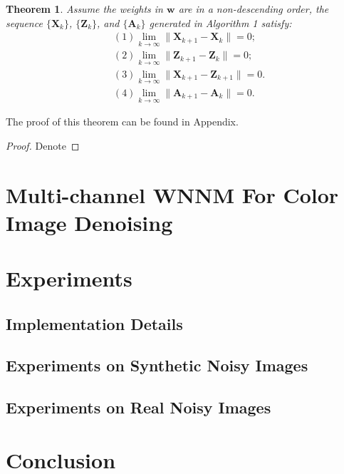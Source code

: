 \documentclass[10pt,twocolumn,letterpaper]{article}
\newtheorem{theorem}{Theorem}
\begin{document}
\begin{theorem}
Assume the weights in $\bm{w}$ are in a non-descending order, the sequence $\{\mathbf{X}_{k}\}$, $\{\mathbf{Z}_{k}\}$, and $\{\mathbf{A}_{k}\}$ generated in Algorithm 1 satisfy:
\begin{align}
&(1) \lim_{k \to \infty} \|\mathbf{X}_{k+1}-\mathbf{X}_{k}\|=0;
\\
&(2) \lim_{k \to \infty} \|\mathbf{Z}_{k+1}-\mathbf{Z}_{k}\|=0;
\\
&(3) \lim_{k \to \infty} \|\mathbf{X}_{k+1}-\mathbf{Z}_{k+1}\|=0.
\\
&(4) \lim_{k \to \infty} \|\mathbf{A}_{k+1}-\mathbf{A}_{k}\|=0.
\end{align}
\end{theorem}
The proof of this theorem can be found in Appendix.
\begin{proof}
Denote


\end{proof}








\section{Multi-channel WNNM For Color Image Denoising}


\section{Experiments}


\subsection{Implementation Details}


\subsection{Experiments on Synthetic Noisy Images}



\subsection{Experiments on Real Noisy Images}



\section{Conclusion}



{
\small


}
\end{document}
